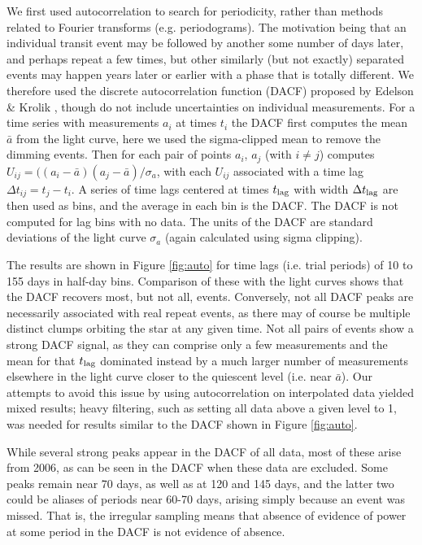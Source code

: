 \documentclass[]{rsos}
\begin{document}
We first used autocorrelation to search for periodicity, rather than methods related to
Fourier transforms (e.g. periodograms). The motivation being that an individual transit
event may be followed by another some number of days later, and perhaps repeat a few
times, but other similarly (but not exactly) separated events may happen years later or
earlier with a phase that is totally different. We therefore used the discrete
autocorrelation function (DACF) proposed by Edelson \& Krolik \cite{1988ApJ...333..646E},
though do not include uncertainties on individual measurements. For a time series with
measurements $a_i$ at times $t_i$ the DACF first computes the mean $\bar{a}$ from the
light curve, here we used the sigma-clipped mean to remove the dimming events. Then for
each pair of points $a_i$, $a_j$ (with $i\ne j$) computes
$U_{ij}=((a_i-\bar{a})(a_j-\bar{a}) / \sigma_a$, with each $U_{ij}$ associated with a
time lag $\Delta t_{ij}=t_j - t_i$. A series of time lags centered at times $t_{\rm lag}$
with width $\Delta t_{\rm lag}$ are then used as bins, and the average in each bin is the
DACF. The DACF is not computed for lag bins with no data. The units of the DACF are
standard deviations of the light curve $\sigma_a$ (again calculated using sigma
clipping).

The results are shown in Figure \ref{fig:auto} for time lags (i.e. trial periods) of 10
to 155 days in half-day bins. Comparison of these with the light curves shows that the
DACF recovers most, but not all, events. Conversely, not all DACF peaks are necessarily
associated with real repeat events, as there may of course be multiple distinct clumps
orbiting the star at any given time. Not all pairs of events show a strong DACF signal,
as they can comprise only a few measurements and the mean for that $t_{\rm lag}$
dominated instead by a much larger number of measurements elsewhere in the light curve
closer to the quiescent level (i.e. near $\bar{a}$). Our attempts to avoid this issue by
using autocorrelation on interpolated data yielded mixed results; heavy filtering, such
as setting all data above a given level to 1, was needed for results similar to the DACF
shown in Figure \ref{fig:auto}.

While several strong peaks appear in the DACF of all data, most of these arise from 2006,
as can be seen in the DACF when these data are excluded. Some peaks remain near 70 days,
as well as at 120 and 145 days, and the latter two could be aliases of periods near 60-70
days, arising simply because an event was missed. That is, the irregular sampling means
that absence of evidence of power at some period in the DACF is not evidence of absence.
\end{document}
